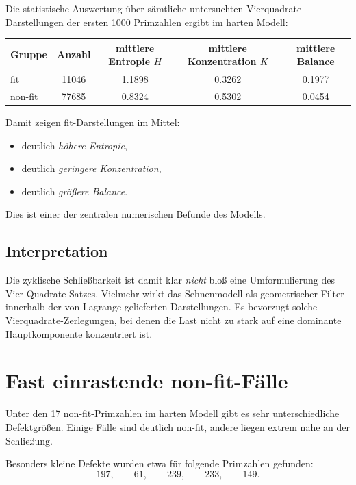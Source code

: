 \documentclass[11pt,a4paper]{article}
\theoremstyle{remark}
\begin{document}
	Die statistische Auswertung über sämtliche untersuchten Vierquadrate-Darstellungen der ersten 1000 Primzahlen ergibt im harten Modell:
	
	\begin{center}
		\begin{tabular}{lcccc}
			\toprule
			Gruppe & Anzahl & mittlere Entropie \(H\) & mittlere Konzentration \(K\) & mittlere Balance \\
			\midrule
			fit     & 11046 & 1.1898 & 0.3262 & 0.1977 \\
			non-fit & 77685 & 0.8324 & 0.5302 & 0.0454 \\
			\bottomrule
		\end{tabular}
	\end{center}
	
	Damit zeigen fit-Darstellungen im Mittel:
	
	\begin{itemize}
		\item deutlich \emph{höhere Entropie},
		\item deutlich \emph{geringere Konzentration},
		\item deutlich \emph{größere Balance}.
	\end{itemize}
	
	Dies ist einer der zentralen numerischen Befunde des Modells.
	
	\subsection{Interpretation}
	
	Die zyklische Schließbarkeit ist damit klar \emph{nicht} bloß eine Umformulierung des Vier-Quadrate-Satzes. 
	Vielmehr wirkt das Sehnenmodell als geometrischer Filter innerhalb der von Lagrange gelieferten Darstellungen. 
	Es bevorzugt solche Vierquadrate-Zerlegungen, bei denen die Last nicht zu stark auf eine dominante Hauptkomponente konzentriert ist.
	
	\section{Fast einrastende non-fit-Fälle}
	
	Unter den 17 non-fit-Primzahlen im harten Modell gibt es sehr unterschiedliche Defektgrößen. 
	Einige Fälle sind deutlich non-fit, andere liegen extrem nahe an der Schließung.
	
	Besonders kleine Defekte wurden etwa für folgende Primzahlen gefunden:
	\[
	197,\qquad 61,\qquad 239,\qquad 233,\qquad 149.
	\]
	
\end{document}

